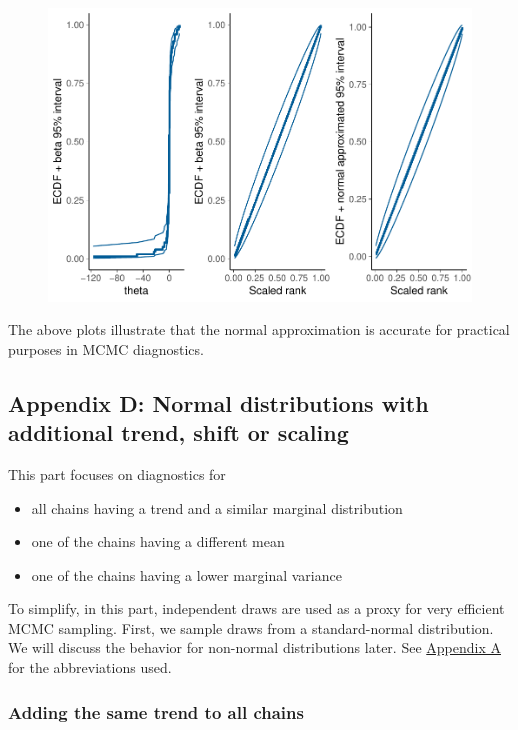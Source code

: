 \documentclass[american,]{article}
\providecommand{\tightlist}{%
  \setlength{\itemsep}{0pt}\setlength{\parskip}{0pt}}
\begin{document}
\begin{figure}[t]
  \centering
  \includegraphics[width=0.6\linewidth]{graphics/ranknorm-cauchy3-1.pdf}
\end{figure}

The above plots illustrate that the normal approximation is accurate for
practical purposes in MCMC diagnostics.

\FloatBarrier

\hypertarget{AppendixD}{%
\subsection*{Appendix D: Normal distributions with additional trend,
shift or scaling}\label{AppendixD}}

This part focuses on diagnostics for

\begin{itemize}
\tightlist
\item
  all chains having a trend and a similar marginal distribution
\item
  one of the chains having a different mean
\item
  one of the chains having a lower marginal variance
\end{itemize}

To simplify, in this part, independent draws are used as a proxy for
very efficient MCMC sampling. First, we sample draws from a
standard-normal distribution. We will discuss the behavior for
non-normal distributions later. See
\protect\hyperlink{AppendixA}{Appendix A} for the abbreviations used.

\hypertarget{adding-the-same-trend-to-all-chains}{%
\subsubsection*{Adding the same trend to all
chains}\label{adding-the-same-trend-to-all-chains}}
\end{document}
